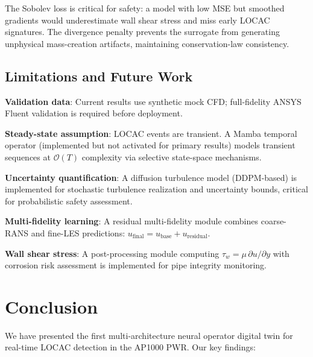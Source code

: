 \documentclass[conference]{IEEEtran}
\begin{document}
The Sobolev loss is critical for safety: a model with low MSE but smoothed gradients would underestimate wall shear stress and miss early LOCAC signatures. The divergence penalty prevents the surrogate from generating unphysical mass-creation artifacts, maintaining conservation-law consistency.

\subsection{Limitations and Future Work}

\textbf{Validation data}: Current results use synthetic mock CFD; full-fidelity ANSYS Fluent validation is required before deployment.

\textbf{Steady-state assumption}: LOCAC events are transient. A Mamba temporal operator (implemented but not activated for primary results) models transient sequences at $\mathcal{O}(T)$ complexity via selective state-space mechanisms.

\textbf{Uncertainty quantification}: A diffusion turbulence model (DDPM-based) is implemented for stochastic turbulence realization and uncertainty bounds, critical for probabilistic safety assessment.

\textbf{Multi-fidelity learning}: A residual multi-fidelity module combines coarse-RANS and fine-LES predictions: $u_\text{final} = u_\text{base} + u_\text{residual}$.

\textbf{Wall shear stress}: A post-processing module computing $\tau_w = \mu\,\partial u/\partial y$ with corrosion risk assessment is implemented for pipe integrity monitoring.

\section{Conclusion}
\label{sec:conclusion}

We have presented the first multi-architecture neural operator digital twin for real-time LOCAC detection in the AP1000 PWR. Our key findings:
\end{document}
